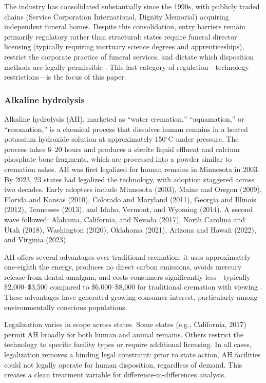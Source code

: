 \documentclass[12pt]{article}
\begin{document}
The industry has consolidated substantially since the 1990s, with publicly traded chains (Service Corporation International, Dignity Memorial) acquiring independent funeral homes. Despite this consolidation, entry barriers remain primarily regulatory rather than structural: states require funeral director licensing (typically requiring mortuary science degrees and apprenticeships), restrict the corporate practice of funeral services, and dictate which disposition methods are legally permissible \citep{thornton2012market}. This last category of regulation---technology restrictions---is the focus of this paper.

\subsubsection*{Alkaline hydrolysis} Alkaline hydrolysis (AH), marketed as ``water cremation,'' ``aquamation,'' or ``resomation,'' is a chemical process that dissolves human remains in a heated potassium hydroxide solution at approximately 150$^{\circ}$C under pressure. The process takes 6--20 hours and produces a sterite liquid effluent and calcium phosphate bone fragments, which are processed into a powder similar to cremation ashes. AH was first legalized for human remains in Minnesota in 2003. By 2023, 23 states had legalized the technology, with adoption staggered across two decades. Early adopters include Minnesota (2003), Maine and Oregon (2009), Florida and Kansas (2010), Colorado and Maryland (2011), Georgia and Illinois (2012), Tennessee (2013), and Idaho, Vermont, and Wyoming (2014). A second wave followed: Alabama, California, and Nevada (2017), North Carolina and Utah (2018), Washington (2020), Oklahoma (2021), Arizona and Hawaii (2022), and Virginia (2023).

AH offers several advantages over traditional cremation: it uses approximately one-eighth the energy, produces no direct carbon emissions, avoids mercury release from dental amalgam, and costs consumers significantly less---typically \$2,000--\$3,500 compared to \$6,000--\$8,000 for traditional cremation with viewing \citep{nfda2023statistics}. These advantages have generated growing consumer interest, particularly among environmentally conscious populations.

Legalization varies in scope across states. Some states (e.g., California, 2017) permit AH broadly for both human and animal remains. Others restrict the technology to specific facility types or require additional licensing. In all cases, legalization removes a binding legal constraint: prior to state action, AH facilities could not legally operate for human disposition, regardless of demand. This creates a clean treatment variable for difference-in-differences analysis.
\end{document}
